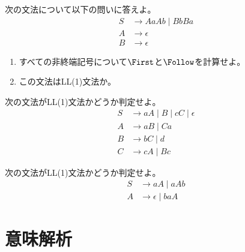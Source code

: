 \begin{exercise}
 次の文法について以下の問いに答えよ。
 \begin{align*}
  S & \rightarrow AaAb \mid BbBa \\
  A & \rightarrow \epsilon \\
  B & \rightarrow \epsilon
 \end{align*}
 \begin{enumerate}
  \item すべての非終端記号について$\First$と$\Follow$を計算せよ。
  \item この文法はLL(1)文法か。
 \end{enumerate}
\end{exercise}
\begin{exercise}
 次の文法がLL(1)文法かどうか判定せよ。
 \begin{align*}
  S & \rightarrow aA \mid B \mid cC \mid \epsilon \\
  A & \rightarrow aB \mid Ca \\
  B & \rightarrow bC \mid d \\
  C & \rightarrow cA \mid Bc
 \end{align*}
\end{exercise}
\begin{exercise}
 次の文法がLL(1)文法かどうか判定せよ。
 \begin{align*}
  S & \rightarrow aA \mid aAb \\
  A & \rightarrow \epsilon \mid baA
 \end{align*}
\end{exercise}

\section{意味解析}

